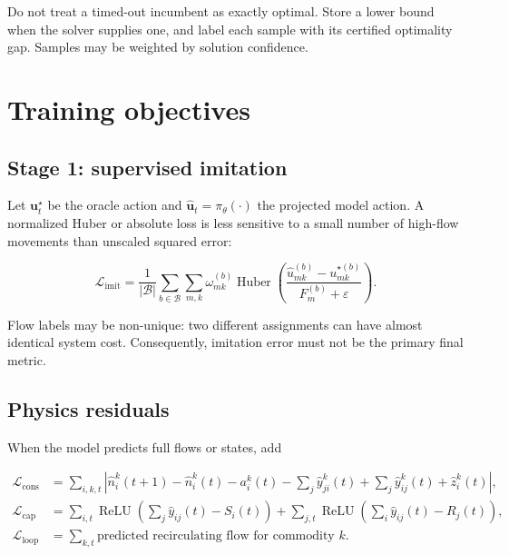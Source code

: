 \documentclass[11pt]{article}
\newcommand{\relu}{\operatorname{ReLU}}
\newcommand{\vect}[1]{\bm{#1}}
\begin{document}
Do not treat a timed-out incumbent as exactly optimal.  Store a lower bound when the
solver supplies one, and label each sample with its certified optimality gap.  Samples
may be weighted by solution confidence.

\section{Training objectives}

\subsection{Stage 1: supervised imitation}

Let \(\vect{u}_t^\star\) be the oracle action and
\(\widehat{\vect{u}}_t=\pi_\theta(\cdot)\) the projected model action.  A normalized
Huber or absolute loss is less sensitive to a small number of high-flow movements than
unscaled squared error:

\begin{equation}
  \mathcal{L}_{\mathrm{imit}}
  = \frac{1}{|\mathcal{B}|}
    \sum_{b\in\mathcal{B}}
    \sum_{m,k}
    \omega_{mk}^{(b)}
    \operatorname{Huber}
    \left(
      \frac{\widehat u_{mk}^{(b)}-u_{mk}^{\star(b)}}
           {F_m^{(b)}+\varepsilon}
    \right).
  \label{eq:imitation}
\end{equation}

Flow labels may be non-unique: two different assignments can have almost identical
system cost.  Consequently, imitation error must not be the primary final metric.

\subsection{Physics residuals}

When the model predicts full flows or states, add

\begin{align}
  \mathcal{L}_{\mathrm{cons}}
    &= \sum_{i,k,t}
       \left|
       \widehat n_i^k(t+1)-\widehat n_i^k(t)-a_i^k(t)
       -\sum_j\widehat y_{ji}^k(t)
       +\sum_j\widehat y_{ij}^k(t)
       +\widehat z_i^k(t)
       \right|,
  \\
  \mathcal{L}_{\mathrm{cap}}
    &= \sum_{i,t}
       \relu\!\left(\sum_j\widehat y_{ij}(t)-S_i(t)\right)
       + \sum_{j,t}
       \relu\!\left(\sum_i\widehat y_{ij}(t)-R_j(t)\right),
  \\
  \mathcal{L}_{\mathrm{loop}}
    &= \sum_{k,t}\text{predicted recirculating flow for commodity }k.
  \label{eq:physics-losses}
\end{align}
\end{document}
